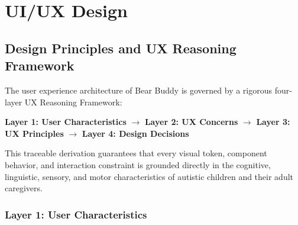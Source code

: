 \chapter{UI/UX Design}

\section{Design Principles and UX Reasoning Framework}

The user experience architecture of Bear Buddy is governed by a rigorous four-layer UX Reasoning Framework:
\begin{center}
\textbf{Layer 1: User Characteristics} $\longrightarrow$ \textbf{Layer 2: UX Concerns} $\longrightarrow$ \textbf{Layer 3: UX Principles} $\longrightarrow$ \textbf{Layer 4: Design Decisions}
\end{center}
This traceable derivation guarantees that every visual token, component behavior, and interaction constraint is grounded directly in the cognitive, linguistic, sensory, and motor characteristics of autistic children and their adult caregivers.

\subsection{Layer 1: User Characteristics}


